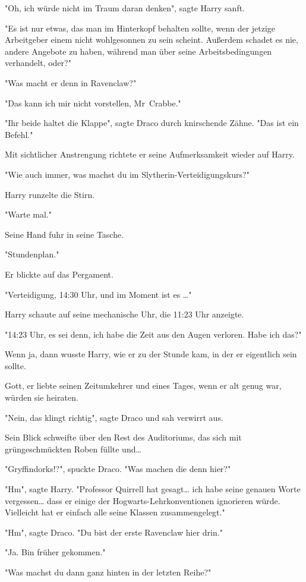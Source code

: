 {"Oh, ich würde nicht im Traum daran denken", sagte Harry sanft.

"Es ist nur etwas, das man im Hinterkopf behalten sollte, wenn der jetzige Arbeitgeber einem nicht wohlgesonnen zu sein scheint. Außerdem schadet es nie, andere Angebote zu haben, während man über seine Arbeitsbedingungen verhandelt, oder?"

"Was macht er denn in Ravenclaw?"

"Das kann ich mir nicht vorstellen, Mr~Crabbe."

"Ihr beide haltet die Klappe", sagte Draco durch knirschende Zähne. "Das ist ein Befehl."

Mit sichtlicher Anstrengung richtete er seine Aufmerksamkeit wieder auf Harry.

"Wie auch immer, was machst du im Slytherin-Verteidigungskurs?"

Harry runzelte die Stirn.

"Warte mal."

Seine Hand fuhr in seine Tasche.

"Stundenplan."

Er blickte auf das Pergament.

"Verteidigung, 14:30 Uhr, und im Moment ist es …"

Harry schaute auf seine mechanische Uhr, die 11:23 Uhr anzeigte.

"14:23 Uhr, es sei denn, ich habe die Zeit aus den Augen verloren. Habe ich das?"

Wenn ja, dann wusste Harry, wie er zu der Stunde kam, in der er eigentlich sein sollte.

Gott, er liebte seinen Zeitumkehrer und eines Tages, wenn er alt genug war, würden sie heiraten.

"Nein, das klingt richtig", sagte Draco und sah verwirrt aus.

Sein Blick schweifte über den Rest des Auditoriums, das sich mit grüngeschmückten Roben füllte und…

"Gryffindorks!?", spuckte Draco. "Was machen die denn hier?"

"Hm", sagte Harry. "Professor Quirrell hat gesagt… ich habe seine genauen Worte vergessen… dass er einige der Hogwarts-Lehrkonventionen ignorieren würde. Vielleicht hat er einfach alle seine Klassen zusammengelegt."

"Hm", sagte Draco. "Du bist der erste Ravenclaw hier drin."

"Ja. Bin früher gekommen."

"Was machst du dann ganz hinten in der letzten Reihe?"

}
